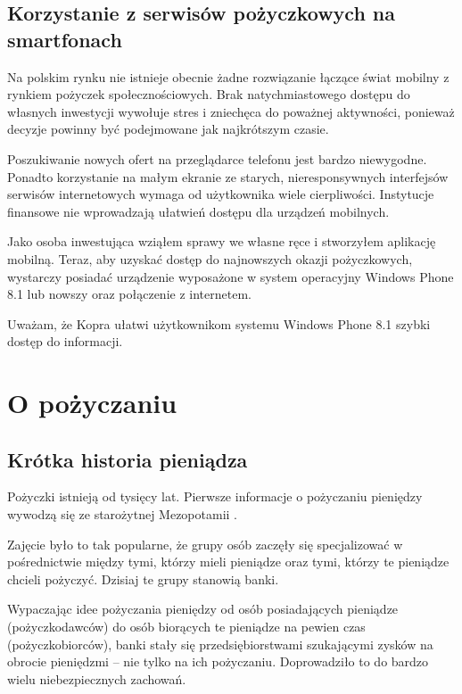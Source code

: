 \documentclass[a4paper,twoside,titlepage,openright]{book}
\begin{document}
\section*{Korzystanie z serwisów pożyczkowych na smartfonach}

Na polskim rynku nie istnieje obecnie żadne rozwiązanie łączące świat mobilny z rynkiem pożyczek społecznościowych. Brak natychmiastowego dostępu do własnych inwestycji wywołuje stres i zniechęca do poważnej aktywności, ponieważ decyzje powinny być podejmowane jak najkrótszym czasie. 

Poszukiwanie nowych ofert na przeglądarce telefonu jest bardzo niewygodne. Ponadto korzystanie na małym ekranie ze starych, nieresponsywnych interfejsów serwisów internetowych wymaga od użytkownika wiele cierpliwości. Instytucje finansowe nie wprowadzają ułatwień dostępu dla urządzeń mobilnych. 

Jako osoba inwestująca wziąłem sprawy we własne ręce i stworzyłem aplikację mobilną. Teraz, aby uzyskać dostęp do najnowszych okazji pożyczkowych, wystarczy posiadać urządzenie wyposażone w system operacyjny Windows Phone 8.1 lub nowszy oraz połączenie z internetem.

Uważam, że Kopra ułatwi użytkownikom systemu Windows Phone 8.1 szybki dostęp do informacji.




\clearpage{\pagestyle{empty}\cleardoublepage}
\chapter{O pożyczaniu}
\section{Krótka historia pieniądza}
Pożyczki istnieją od tysięcy lat. Pierwsze informacje o pożyczaniu pieniędzy wywodzą się ze starożytnej Mezopotamii \cite{financingCivilization}. 

Zajęcie było to tak popularne, że grupy osób zaczęły się specjalizować w pośrednictwie między tymi, którzy mieli pieniądze oraz tymi, którzy te pieniądze chcieli pożyczyć. Dzisiaj te grupy stanowią banki. 

Wypaczając idee pożyczania pieniędzy od osób posiadających pieniądze (pożyczkodawców) do osób biorących te pieniądze na pewien czas (pożyczkobiorców), banki stały się przedsiębiorstwami szukającymi zysków na obrocie pieniędzmi -- nie tylko na ich pożyczaniu. Doprowadziło to do bardzo wielu niebezpiecznych zachowań. 
\end{document}
